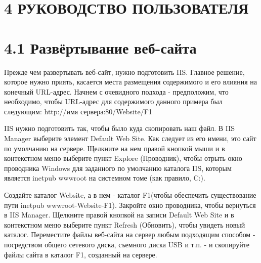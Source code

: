 \documentclass[14pt,a4paper]{extreport}
\begin{document}
	\newpage
           \flushleft\hspace{4ex}\section*{\normalsize\hspace{4ex}4 РУКОВОДСТВО ПОЛЬЗОВАТЕЛЯ}
 	\flushleft\hspace{4ex}\section*{\normalsize\hspace{4ex}4.1 Развёртывание веб-сайта}
\flushleft\hspace{4ex}Прежде чем развертывать веб-сайт, нужно подготовить IIS. Главное решение, которое нужно приять, касается места размещения содержимого и его влияния на конечный URL-адрес. Начнем с очевидного подхода - предположим, что необходимо, чтобы URL-адрес для содержимого данного примера был следующим: http://имя сервера:80/Website/F1\par
IIS нужно подготовить так, чтобы было куда скопировать наш файл. В IIS Manager выберите элемент Default Web Site. Как следует из его имени, это сайт по умолчанию на сервере. Щелкните на нем правой кнопкой мыши и в контекстном меню выберите пункт Explore (Проводник), чтобы отрыть окно проводника Windows для заданного по умолчанию каталога IIS, которым является inetpub wwwroot на системном томе (как правило, C:).\par
Создайте каталог Website, а в нем - каталог F1(чтобы обеспечить существование пути inetpub wwwroot-Website-F1). Закройте окно проводника, чтобы вернуться в IIS Manager. Щелкните правой кнопкой на записи Default Web Site и в контекстном меню выберите пункт Refresh (Обновить), чтобы увидеть новый каталог. Переместите файлы веб-сайта на сервер любым подходящим способом - посредством общего сетевого диска, съемного диска USB и т.п. - и скопируйте файлы сайта в каталог F1, созданный на сервере.\par
\end{document}
